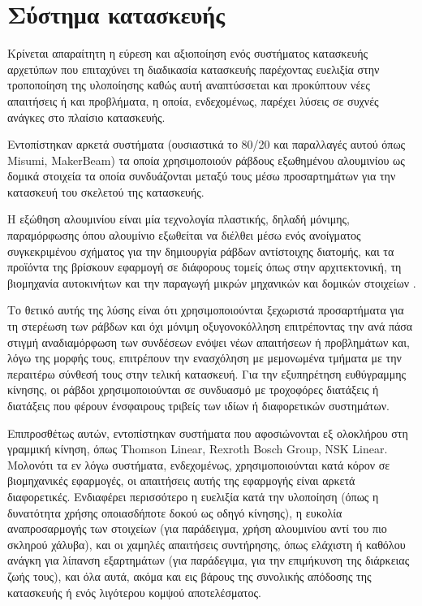 \section{Σύστημα κατασκευής}
\label{sec:construct:framework}

Κρίνεται απαραίτητη η εύρεση και αξιοποίηση ενός συστήματος κατασκευής αρχετύπων
που επιταχύνει τη διαδικασία κατασκευής παρέχοντας ευελιξία στην τροποποίηση της
υλοποίησης καθώς αυτή αναπτύσσεται και προκύπτουν νέες απαιτήσεις ή και
προβλήματα, η οποία, ενδεχομένως, παρέχει λύσεις σε συχνές ανάγκες στο πλαίσιο
κατασκευής.

Εντοπίστηκαν αρκετά συστήματα (ουσιαστικά το 80/20 και παραλλαγές αυτού όπως
Misumi, MakerBeam) τα οποία χρησιμοποιούν ράβδους εξωθημένου αλουμινίου ως
δομικά στοιχεία τα οποία συνδυάζονται μεταξύ τους μέσω προσαρτημάτων για την
κατασκευή του σκελετού της κατασκευής.

Η εξώθηση αλουμινίου είναι μία τεχνολογία πλαστικής, δηλαδή μόνιμης,
παραμόρφωσης όπου αλουμίνιο εξωθείται να διέλθει μέσω ενός ανοίγματος
συγκεκριμένου σχήματος για την δημιουργία ράβδων αντίστοιχης διατομής, και τα
προϊόντα της βρίσκουν εφαρμογή σε διάφορους τομείς όπως στην αρχιτεκτονική,
τη βιομηχανία αυτοκινήτων και την παραγωγή μικρών μηχανικών και δομικών
στοιχείων \parencite{saha00}.

Το θετικό αυτής της λύσης είναι ότι χρησιμοποιούνται ξεχωριστά προσαρτήματα για
τη στερέωση των ράβδων και όχι μόνιμη οξυγονοκόλληση επιτρέποντας την ανά πάσα
στιγμή αναδιαμόρφωση των συνδέσεων ενόψει νέων απαιτήσεων ή προβλημάτων και,
λόγω της μορφής τους, επιτρέπουν την ενασχόληση με μεμονωμένα τμήματα με την
περαιτέρω σύνθεσή τους στην τελική κατασκευή.
Για την εξυπηρέτηση ευθύγραμμης κίνησης, οι ράβδοι χρησιμοποιούνται σε συνδυασμό
με τροχοφόρες διατάξεις ή διατάξεις που φέρουν ένσφαιρους τριβείς των ιδίων ή
διαφορετικών συστημάτων.

Επιπροσθέτως αυτών, εντοπίστηκαν συστήματα που αφοσιώνονται εξ ολοκλήρου στη
γραμμική κίνηση, όπως Thomson Linear, Rexroth Bosch Group, NSK Linear.
Μολονότι τα εν λόγω συστήματα, ενδεχομένως, χρησιμοποιούνται κατά κόρον σε
βιομηχανικές εφαρμογές, οι απαιτήσεις αυτής της εφαρμογής είναι αρκετά
διαφορετικές. Ενδιαφέρει περισσότερο η ευελιξία κατά την υλοποίηση (όπως η
δυνατότητα χρήσης οποιασδήποτε δοκού ως οδηγό κίνησης), η ευκολία αναπροσαρμογής
των στοιχείων (για παράδειγμα, χρήση αλουμινίου αντί του πιο σκληρού χάλυβα),
και οι χαμηλές απαιτήσεις συντήρησης, όπως ελάχιστη ή καθόλου ανάγκη για λίπανση
εξαρτημάτων (για παράδεγιμα, για την επιμήκυνση της διάρκειας ζωής τους), και
όλα αυτά, ακόμα και εις βάρους της συνολικής απόδοσης της κατασκευής ή ενός
λιγότερου κομψού αποτελέσματος.

